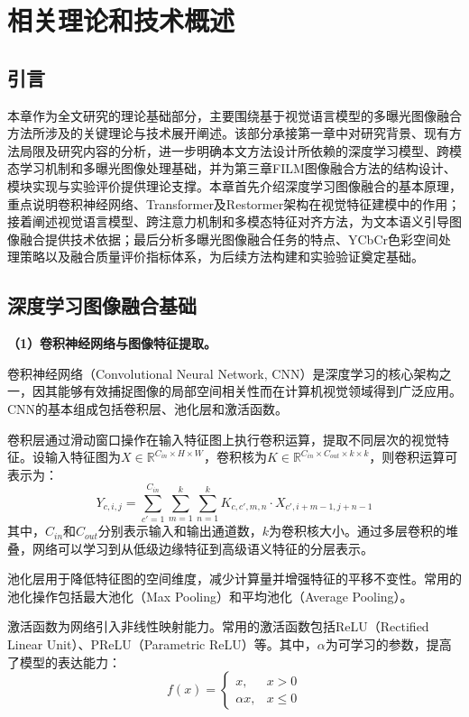 \section{相关理论和技术概述}\label{ch:theory}

\subsection{引言}\label{sec:ch2_intro}

本章作为全文研究的理论基础部分，主要围绕基于视觉语言模型的多曝光图像融合方法所涉及的关键理论与技术展开阐述。该部分承接第一章中对研究背景、现有方法局限及研究内容的分析，进一步明确本文方法设计所依赖的深度学习模型、跨模态学习机制和多曝光图像处理基础，并为第三章FILM图像融合方法的结构设计、模块实现与实验评价提供理论支撑。本章首先介绍深度学习图像融合的基本原理，重点说明卷积神经网络、Transformer及Restormer架构在视觉特征建模中的作用；接着阐述视觉语言模型、跨注意力机制和多模态特征对齐方法，为文本语义引导图像融合提供技术依据；最后分析多曝光图像融合任务的特点、YCbCr色彩空间处理策略以及融合质量评价指标体系，为后续方法构建和实验验证奠定基础。

\subsection{深度学习图像融合基础}\label{sec:dl_foundation}

\textbf{（1）卷积神经网络与图像特征提取。}

卷积神经网络（Convolutional Neural Network, CNN）是深度学习的核心架构之一，因其能够有效捕捉图像的局部空间相关性而在计算机视觉领域得到广泛应用。CNN的基本组成包括卷积层、池化层和激活函数。

卷积层通过滑动窗口操作在输入特征图上执行卷积运算，提取不同层次的视觉特征。设输入特征图为$X \in \mathbb{R}^{C_{in} \times H \times W}$，卷积核为$K \in \mathbb{R}^{C_{in} \times C_{out} \times k \times k}$，则卷积运算可表示为：
\begin{equation}
    Y_{c,i,j} = \sum_{c'=1}^{C_{in}} \sum_{m=1}^{k} \sum_{n=1}^{k} K_{c,c',m,n} \cdot X_{c',i+m-1,j+n-1}
\end{equation}
其中，$C_{in}$和$C_{out}$分别表示输入和输出通道数，$k$为卷积核大小。通过多层卷积的堆叠，网络可以学习到从低级边缘特征到高级语义特征的分层表示。

池化层用于降低特征图的空间维度，减少计算量并增强特征的平移不变性。常用的池化操作包括最大池化（Max Pooling）和平均池化（Average Pooling）。

激活函数为网络引入非线性映射能力。常用的激活函数包括ReLU（Rectified Linear Unit）、PReLU（Parametric ReLU）等。其中，$\alpha$为可学习的参数，提高了模型的表达能力：
\begin{equation}
    f(x) = \begin{cases}
        x, & x > 0 \\
        \alpha x, & x \leq 0
    \end{cases}
\end{equation}

